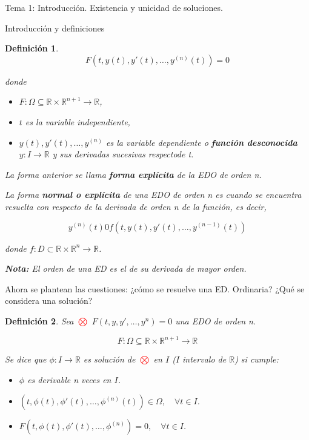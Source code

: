 \documentclass{article}
\newtheorem{definition}{Definición}[section]
\begin{document}
\begin{section}{Tema 1: Introducción. Existencia y unicidad de soluciones.}
\begin{subsection}{Introducción y definiciones}
\begin{definition}
            \[F(t, y(t), y'(t), \dots, y^{(n)}(t)) = 0\]
    
            donde 
            \begin{itemize}
                \item $F: \Omega \subseteq \mathbb{R} \times \mathbb{R}^{n+1} \longrightarrow \mathbb{R}$, 
                \item $t$ es la variable independiente,
                \item $y(t), y'(t), \dots, y^{(n)}$ es la variable dependiente o \textbf{función desconocida}
                $y: I \rightarrow \mathbb{R}$ y sus derivadas sucesivas respectode t.
            \end{itemize}
    
            La forma anterior se llama \textbf{forma explícita} de la EDO de orden n.
    
            La forma \textbf{normal o explícita} de una EDO de orden n es cuando se encuentra resuelta
            con respecto de la derivada de orden n de la función, es decir,
    
            \[y^{(n)}(t) 0 f(t, y(t), y'(t), \dots, y^{(n-1)}(t))\]
    
            donde $f: D \subset \mathbb{R} \times \mathbb{R}^n \longrightarrow \mathbb{R}$.
    
            \textbf{Nota: } El orden de una ED es el de su derivada de mayor orden.
    
        \end{definition}
    
        Ahora se plantean las cuestiones: ¿cómo se resuelve una ED. Ordinaria? ¿Qué
        se considera una solución?
    
        \begin{definition}
    
            Sea \textcolor{red}{$\bigotimes$} $F(t, y, y', \dots, y^{n}) = 0$ una EDO de orden n.
        
            \[F: \Omega \subseteq \mathbb{R} \times \mathbb{R}^{n+1} \longrightarrow \mathbb{R}\]
    
            Se dice que $\phi : I \rightarrow \mathbb{R}$ es solución de \textcolor{red}{$\bigotimes$} en $I$ ($I$ intervalo de $\mathbb{R}$)
            si cumple:
    
            \begin{itemize}
                \item $\phi$ es derivable n veces en $I$.
                \item $(t, \phi (t), \phi'(t), \dots, \phi^{(n)}(t)) \in \Omega, \quad \forall t \in I$.
                \item $F(t, \phi(t), \phi'(t), \dots, \phi^{(n)}) = 0, \quad \forall t \in I$.
            \end{itemize}
    

\end{definition}
\end{subsection}
\end{section}
\end{document}
